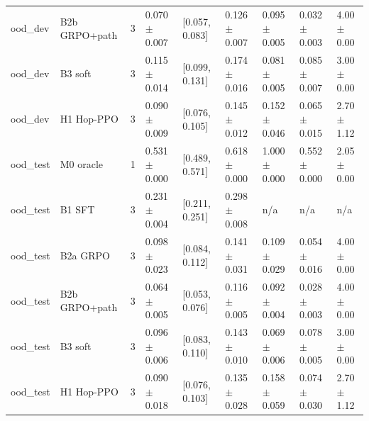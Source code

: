 \begin{tabular}{lllllllll}
ood\_dev & B2b GRPO+path & 3 & 0.070$\pm$0.007 & [0.057, 0.083] & 0.126$\pm$0.007 & 0.095$\pm$0.005 & 0.032$\pm$0.003 & 4.00$\pm$0.00 \\
ood\_dev & B3 soft & 3 & 0.115$\pm$0.014 & [0.099, 0.131] & 0.174$\pm$0.016 & 0.081$\pm$0.005 & 0.085$\pm$0.007 & 3.00$\pm$0.00 \\
ood\_dev & H1 Hop-PPO & 3 & 0.090$\pm$0.009 & [0.076, 0.105] & 0.145$\pm$0.012 & 0.152$\pm$0.046 & 0.065$\pm$0.015 & 2.70$\pm$1.12 \\
ood\_test & M0 oracle & 1 & 0.531$\pm$0.000 & [0.489, 0.571] & 0.618$\pm$0.000 & 1.000$\pm$0.000 & 0.552$\pm$0.000 & 2.05$\pm$0.00 \\
ood\_test & B1 SFT & 3 & 0.231$\pm$0.004 & [0.211, 0.251] & 0.298$\pm$0.008 & n/a & n/a & n/a \\
ood\_test & B2a GRPO & 3 & 0.098$\pm$0.023 & [0.084, 0.112] & 0.141$\pm$0.031 & 0.109$\pm$0.029 & 0.054$\pm$0.016 & 4.00$\pm$0.00 \\
ood\_test & B2b GRPO+path & 3 & 0.064$\pm$0.005 & [0.053, 0.076] & 0.116$\pm$0.005 & 0.092$\pm$0.004 & 0.028$\pm$0.003 & 4.00$\pm$0.00 \\
ood\_test & B3 soft & 3 & 0.096$\pm$0.006 & [0.083, 0.110] & 0.143$\pm$0.010 & 0.069$\pm$0.006 & 0.078$\pm$0.005 & 3.00$\pm$0.00 \\
ood\_test & H1 Hop-PPO & 3 & 0.090$\pm$0.018 & [0.076, 0.103] & 0.135$\pm$0.028 & 0.158$\pm$0.059 & 0.074$\pm$0.030 & 2.70$\pm$1.12 \\
\bottomrule
\end{tabular}
